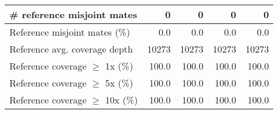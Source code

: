 \documentclass[12pt,a4paper]{article}
\begin{document}
\begin{table}[ht]
\begin{center}
\begin{tabular}{|l*{4}{|r}|}
\# reference misjoint mates & 0 & 0 & 0 & 0 \\ \hline
Reference misjoint mates (\%) & 0.0 & 0.0 & 0.0 & 0.0 \\ \hline
Reference avg. coverage depth & 10273 & 10273 & 10273 & 10273 \\ \hline
Reference coverage $\geq$ 1x (\%) & 100.0 & 100.0 & 100.0 & 100.0 \\ \hline
Reference coverage $\geq$ 5x (\%) & 100.0 & 100.0 & 100.0 & 100.0 \\ \hline
Reference coverage $\geq$ 10x (\%) & 100.0 & 100.0 & 100.0 & 100.0 \\ \hline
\end{tabular}
\end{center}
\end{table}
\end{document}
